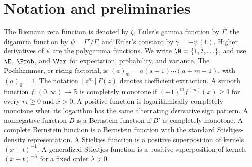 \section{Notation and preliminaries}
The Riemann zeta function is denoted by \(\zeta\), Euler's gamma function by \(\Gamma\), the digamma function by \(\psi=\Gamma'/\Gamma\), and Euler's constant by \(\gamma=-\psi(1)\).  Higher derivatives of \(\psi\) are the polygamma functions.  We write \(\N=\{1,2,\ldots\}\), and use \(\E\), \(\Prob\), and \(\Var\) for expectation, probability, and variance.
The Pochhammer, or rising factorial, is \((a)_m=a(a+1)\cdots(a+m-1)\), with \((a)_0=1\).  The notation \([z^m]F(z)\) denotes coefficient extraction.
A smooth function \(f:(0,\infty)\to\mathbb R\) is completely monotone if \((-1)^m f^{(m)}(x)\ge0\) for every \(m\ge0\) and \(x>0\).  A positive function is logarithmically completely monotone when its logarithm has the same alternating derivative sign pattern.  A nonnegative function \(B\) is a Bernstein function if \(B'\) is completely monotone.  A complete Bernstein function is a Bernstein function with the standard Stieltjes-density representation.  A Stieltjes function is a positive superposition of kernels \((x+t)^{-1}\).  A generalized Stieltjes function is a positive superposition of kernels \((x+t)^{-\lambda}\) for a fixed order \(\lambda>0\).
